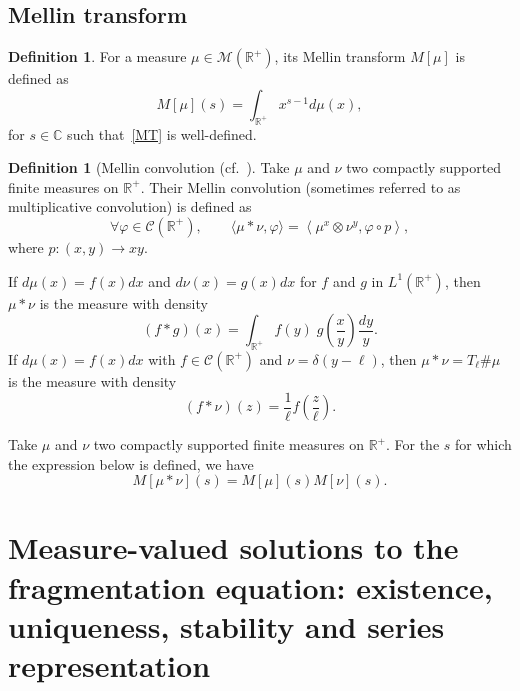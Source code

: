 \documentclass[10pt]{amsart}
\theoremstyle{definition}\newtheorem{defi}[theo]{Definition}\newtheorem{rema}[theo]{Remark}\newtheorem{exam}[theo]{Example}\newtheorem{exem}[theo]{Example}\newtheorem{nota}[theo]{Notation}
\newcommand*\dst{\displaystyle}
\newcommand*\R{\mathbb{R}}
\newcommand*\C{\mathbb{C}}
\newcommand*\M{\mathcal{M}}
\newcommand{\clC}{\mathcal{C}}
\let\oldforall\forall
\renewcommand*{\forall}{\mathrel{\oldforall}}
\begin{document}
\subsection{Mellin transform}

\begin{defi}
For a measure $\mu \in \M(\R^+)$, its Mellin transform $M[\mu]$ is defined as
\begin{equation}\label{MT}
M[\mu](s)= \dst\int_{\R^+} x^{s-1}d\mu(x),
\end{equation}
for $s\in \C$ such that~\eqref{MT} is well-defined.
\end{defi}


\begin{defi}[Mellin convolution (cf.~\cite{ML}]\label{def:mult_conv}
Take $\mu$ and $\nu$ two compactly supported finite measures on $\R^+$. Their Mellin convolution (sometimes referred to as multiplicative convolution) is defined as
\begin{equation*}
\forall \varphi \in \clC(\R^+), \qquad \langle\mu \ast \nu,\varphi\rangle = \left\langle \mu^x \otimes \nu^y,\varphi\circ p \right\rangle,
\end{equation*}
where $p : (x,y)\to xy$.
\end{defi}

If $d\mu(x)=f(x)dx$ and $d\nu(x)=g(x)dx$ for $f$ and $g$ in $L^1(\R^+)$, then $\mu\ast\nu$ is the measure with density
\begin{equation*}
(f\ast g) (x) =\dst\int_{\R^+} f(y)\; g\left(\dfrac{x}{y}\right)\dfrac{dy}{y}.
\end{equation*}
If $d\mu(x)=f(x)dx$ with $f\in \clC(\R^+)$ and $\nu=\delta(y-\ell)$, then $\mu\ast\nu=T_\ell \# \mu$ is the measure with density
\begin{equation*}
(f\ast \nu)(z)= \dfrac{1}{\ell}f\left(\dfrac{z}{\ell}\right).
\end{equation*}


\begin{prop}\label{prop:MellinMC}
Take $\mu$ and $\nu$ two compactly supported finite measures on $\R^+$. For the $s$ for which the expression below is defined, we have
\begin{equation*}
M[\mu\ast\nu](s) = M[\mu](s) M[\nu](s).
\end{equation*}
\end{prop}



\section{Measure-valued solutions to the fragmentation equation: existence, uniqueness, stability and series representation}
\label{Section20}
\end{document}
